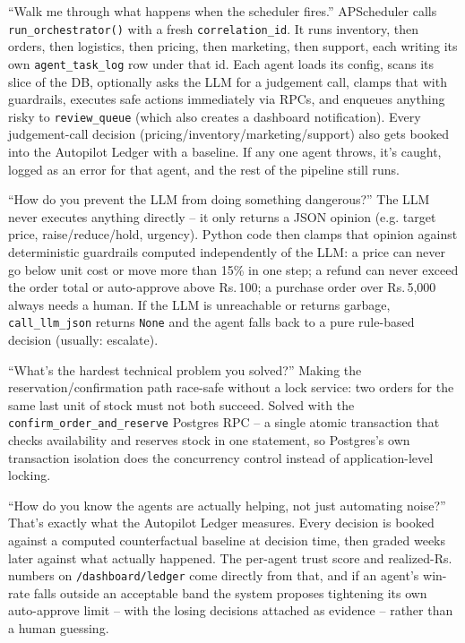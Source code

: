 \documentclass[11pt,a4paper]{article}
\newcommand{\Rs}{Rs.\,}
\begin{document}
\begin{qabox}{``Walk me through what happens when the scheduler fires.''}
APScheduler calls \texttt{run\_orchestrator()} with a fresh \texttt{correlation\_id}. It runs
inventory, then orders, then logistics, then pricing, then marketing, then support, each
writing its own \texttt{agent\_task\_log} row under that id. Each agent loads its config,
scans its slice of the DB, optionally asks the LLM for a judgement call, clamps that with
guardrails, executes safe actions immediately via RPCs, and enqueues anything risky to
\texttt{review\_queue} (which also creates a dashboard notification). Every judgement-call
decision (pricing/inventory/marketing/support) also gets booked into the Autopilot Ledger with
a baseline. If any one agent throws, it's caught, logged as an error for that agent, and the
rest of the pipeline still runs.
\end{qabox}

\begin{qabox}{``How do you prevent the LLM from doing something dangerous?''}
The LLM never executes anything directly -- it only returns a JSON opinion (e.g. target price,
raise/reduce/hold, urgency). Python code then clamps that opinion against deterministic
guardrails computed independently of the LLM: a price can never go below unit cost or move more
than 15\% in one step; a refund can never exceed the order total or auto-approve above \Rs{}100; a
purchase order over \Rs{}5,000 always needs a human. If the LLM is unreachable or returns garbage,
\texttt{call\_llm\_json} returns \texttt{None} and the agent falls back to a pure rule-based
decision (usually: escalate).
\end{qabox}

\begin{qabox}{``What's the hardest technical problem you solved?''}
Making the reservation/confirmation path race-safe without a lock service: two orders for the
same last unit of stock must not both succeed. Solved with the \texttt{confirm\_order\_and\_reserve}
Postgres RPC -- a single atomic transaction that checks availability and reserves stock in one
statement, so Postgres's own transaction isolation does the concurrency control instead of
application-level locking.
\end{qabox}

\begin{qabox}{``How do you know the agents are actually helping, not just automating noise?''}
That's exactly what the Autopilot Ledger measures. Every decision is booked against a
computed counterfactual baseline at decision time, then graded weeks later against what
actually happened. The per-agent trust score and realized-\Rs{} numbers on \texttt{/dashboard/ledger}
come directly from that, and if an agent's win-rate falls outside an acceptable band the system
proposes tightening its own auto-approve limit -- with the losing decisions attached as
evidence -- rather than a human guessing.
\end{qabox}
\end{document}
